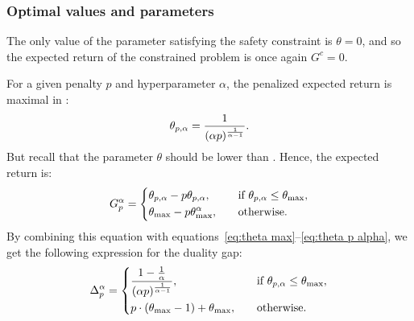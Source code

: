 \subsubsection{Optimal values and parameters}
The only value of the parameter satisfying the safety constraint is $\theta = 0$, and so the expected return of the constrained problem is once again $G^c = 0$.\par
For a given penalty $p$ and hyperparameter $\alpha$, the penalized expected return is maximal in :
\begin{equation}
	\theta_{p, \alpha} = \frac{1}{(\alpha p)^\frac{1}{\alpha - 1}}.\label{eq:theta p alpha}
\end{equation}
But recall that the parameter $\theta$ should be lower than \thetamax. Hence, the expected return is:
\begin{equation*}
	G_p^\alpha = \begin{dcases}
		\theta_{p, \alpha} - p \theta_{p, \alpha},&\quad\text{if}~\theta_{p, \alpha}\leq\theta_\text{max},\\
		\theta_\text{max} - p \theta_\text{max}^\alpha,&\quad\text{otherwise}.
	\end{dcases}
\end{equation*}
By combining this equation with equations~\eqref{eq:theta max}--\eqref{eq:theta p alpha}, we get the following expression for the duality gap:
\begin{equation}
	\Delta_p^\alpha = \begin{dcases}
	\frac{1 - \frac{1}{\alpha}}{(\alpha p)^\frac{1}{\alpha - 1}}, &\quad\text{if}~\theta_{p, \alpha}\leq\theta_\text{max},\\
	p\cdot(\theta_\text{max} - 1) + \theta_\text{max},&\quad\text{otherwise}.
	\end{dcases} \label{eq:duality gap}
\end{equation}

